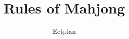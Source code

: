 \documentclass{article}
\begin{document}
\title{Rules of Mahjong}
\author{Eetplan}
\maketitle
\end{document}
